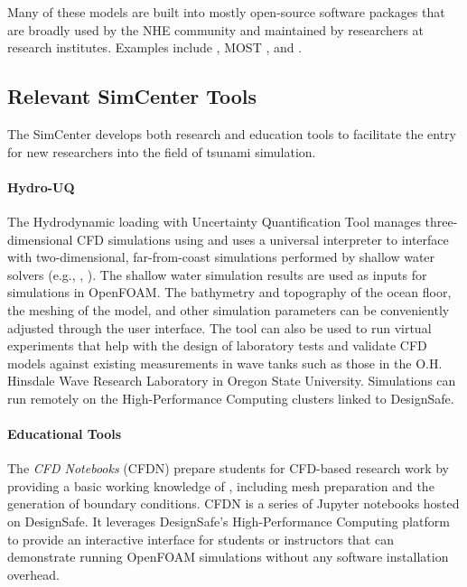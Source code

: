 Many of these models are built into mostly open-source software packages that are broadly used by the NHE community and maintained by researchers at research institutes. Examples include   \citep{berger2011geoclaw}, MOST \citep{titov1997implementation}, and   \citep{macias2016comparison}.

\subsection{Relevant SimCenter Tools}

The SimCenter develops both research and education tools to facilitate the entry for new researchers into the field of tsunami simulation.

\paragraph{Hydro-UQ} The Hydrodynamic loading with Uncertainty Quantification Tool  manages three-dimensional CFD simulations using  and uses a universal interpreter to interface with two-dimensional, far-from-coast simulations performed by shallow water solvers (e.g., , ). The shallow water simulation results are used as inputs for simulations in OpenFOAM. The bathymetry and topography of the ocean floor, the meshing of the model, and other simulation parameters can be conveniently adjusted through the user interface. The tool can also be used to run virtual experiments that help with the design of laboratory tests and validate CFD models against existing measurements in wave tanks such as those in the O.H. Hinsdale Wave Research Laboratory in Oregon State University. Simulations can run remotely on the High-Performance Computing clusters linked to DesignSafe.

\paragraph{Educational Tools} 
The \emph{CFD Notebooks} (CFDN) prepare students for CFD-based research work by providing a basic working knowledge of , including mesh preparation and the generation of boundary conditions. CFDN is a series of Jupyter notebooks hosted on DesignSafe. It leverages DesignSafe's High-Performance Computing platform to provide an interactive interface for students or instructors that can demonstrate running OpenFOAM simulations without any software installation overhead.

